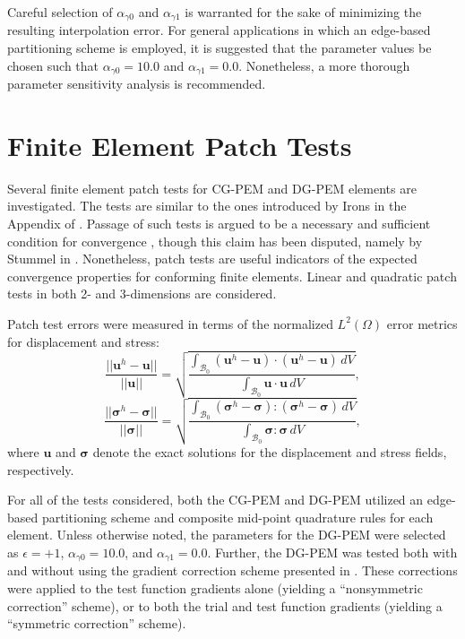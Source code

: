 Careful selection of $\alpha_{\gamma0}$ and $\alpha_{\gamma1}$ is warranted for the sake of minimizing the resulting interpolation error. For general applications in which an edge-based partitioning scheme is employed, it is suggested that the parameter values be chosen such that $\alpha_{\gamma0} = 10.0$ and $\alpha_{\gamma1} = 0.0$. Nonetheless, a more thorough parameter sensitivity analysis is recommended.

\section{Finite Element Patch Tests}

Several finite element patch tests for CG-PEM and DG-PEM elements are investigated. The tests are similar to the ones introduced by Irons in the Appendix of \cite{Irons:65}. Passage of such tests is argued to be a necessary and sufficient condition for convergence \cite{Simo&Taylor:86}, though this claim has been disputed, namely by Stummel in \cite{Stummel:80}. Nonetheless, patch tests are useful indicators of the expected convergence properties for conforming finite elements. Linear and quadratic patch tests in both 2- and 3-dimensions are considered.

Patch test errors were measured in terms of the normalized $L^2 (\Omega)$ error metrics for displacement and stress:
\begin{equation}
	\frac{||\mathbf{u}^h - \mathbf{u}||}{||\mathbf{u}||} = \sqrt{\frac{\int_{\mathcal{B}_0} (\mathbf{u}^h - \mathbf{u}) \cdot (\mathbf{u}^h - \mathbf{u}) \, dV}{\int_{\mathcal{B}_0} \mathbf{u} \cdot \mathbf{u} \, dV}},
\end{equation}
\begin{equation}
	\frac{||\boldsymbol{\sigma}^h - \boldsymbol{\sigma}||}{||\boldsymbol{\sigma}||} = \sqrt{\frac{\int_{\mathcal{B}_0} (\boldsymbol{\sigma}^h - \boldsymbol{\sigma}) \colon (\boldsymbol{\sigma}^h - \boldsymbol{\sigma}) \, dV}{\int_{\mathcal{B}_0} \boldsymbol{\sigma} \colon \boldsymbol{\sigma} \, dV}},
	\label{eq:normalized_stress_error}
\end{equation}
where $\mathbf{u}$ and $\boldsymbol{\sigma}$ denote the exact solutions for the displacement and stress fields, respectively.

For all of the tests considered, both the CG-PEM and DG-PEM utilized an edge-based partitioning scheme and composite mid-point quadrature rules for each element. Unless otherwise noted, the parameters for the DG-PEM were selected as $\epsilon = +1$, $\alpha_{\gamma0} = 10.0$, and $\alpha_{\gamma1} = 0.0$. Further, the DG-PEM was tested both with and without using the gradient correction scheme presented in \cite{Talischi:15}. These corrections were applied to the test function gradients alone (yielding a ``nonsymmetric correction'' scheme), or to both the trial and test function gradients (yielding a ``symmetric correction'' scheme).

